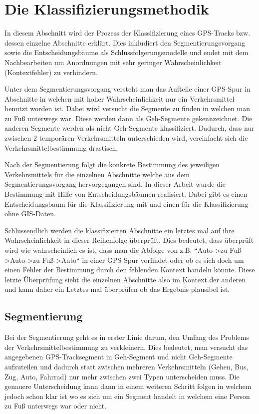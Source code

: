\chapter{Die Klassifizierungsmethodik}
In diesem Abschnitt wird der Prozess der Klassifizierung eines GPS-Tracks bzw. dessen einzelne Abschnitte erklärt. Dies inkludiert den Segmentierungsvorgang sowie die Entscheidungsbäume als Schlussfolgerungsmodelle und endet mit dem Nachbearbeiten um Anordnungen mit sehr geringer Wahrscheinlichkeit (Kontextfehler) zu verhindern.

Unter dem Segmentierungsvorgang versteht man das Aufteile einer GPS-Spur in Abschnitte in welchen mit hoher Wahrscheinlichkeit nur ein Verkehrsmittel benutzt worden ist. Dabei wird versucht die Segmente zu finden in welchen man zu Fuß unterwegs war. Diese werden dann als Geh-Segmente gekennzeichnet. Die anderen Segmente werden als nicht Geh-Segmente klassifiziert. Dadurch, dass nur zwischen 2 temporären Verkehrsmitteln unterschieden wird, vereinfacht sich die  Verkehrsmittelbestimmung drastisch.

Nach der Segmentierung folgt die konkrete Bestimmung des jeweiligen Verkehrsmittels für die einzelnen Abschnitte welche aus dem Segmentierungsvorgang hervorgegangen sind. In dieser Arbeit wurde die Bestimmung mit Hilfe von Entscheidungsbäumen realisiert. Dabei gibt es einen Entscheidungsbaum für die Klassifizierung mit und einen für die Klassifizierung ohne GIS-Daten. 

Schlussendlich werden die klassifizierten Abschnitte ein letztes mal auf ihre Wahrscheinlichkeit in dieser Reihenfolge überprüft. Dies bedeutet, dass überprüft wird wie wahrscheinlich es ist, dass man die Abfolge von z.B. ``Auto->zu Fuß->Auto->zu Fuß->Auto`` in einer GPS-Spur vorfindet oder ob es sich doch um einen Fehler der Bestimmung durch den fehlenden Kontext handeln könnte. Diese letzte Überprüfung sieht die einzelnen Abschnitte also im Kontext der anderen und kann daher ein Letztes mal überprüfen ob das Ergebnis plausibel ist.
\clearpage

\section{Segmentierung}
\label{segmentierung}
Bei der Segmentierung geht es in erster Linie darum, den Umfang des Problems der Verkehrsmittelbestimmung zu verkleinern. Dies bedeutet, man versucht das angegebenen GPS-Tracksegment in Geh-Segment und nicht Geh-Segmente aufzuteilen und dadurch statt zwischen mehreren Verkehrsmitteln (Gehen, Bus, Zug, Auto, Fahrrad) nur mehr zwischen zwei Typen unterscheiden muss. Die genauere Unterscheidung kann dann in einem weiteren Schritt folgen in welchem jedoch schon klar ist wo es sich um ein Segment handelt in welchem eine Person zu Fuß unterwegs war oder nicht. 

